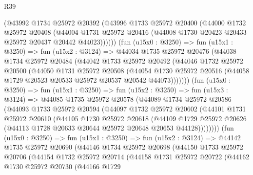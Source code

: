 \begin{lexlean}{R39}
\begin{coremodule}
          (@43992
            @1734
            @25972
            @20392
            (@43996
              @1733
              @25972
              @20400
              (@44000
                @1732
                @25972
                @20408
                (@44004
                  @1731
                  @25972
                  @20416
                  (@44008 @1730 @20423 @20433 @25972 @20437 @20442 @44023))))))
        (fun (u15x0 : @3250) =>
        fun (u15x1 : @3250) =>
        fun (u15x2 : @3124) =>
        @44034
          @1735
          @25972
          @20476
          (@44038
            @1734
            @25972
            @20484
            (@44042
              @1733
              @25972
              @20492
              (@44046
                @1732
                @25972
                @20500
                (@44050
                  @1731
                  @25972
                  @20508
                  (@44054
                    @1730
                    @25972
                    @20516
                    (@44058 @1729 @20523 @20533 @25972 @20537 @20542 @44073)))))))
        (fun (u15x0 : @3250) =>
        fun (u15x1 : @3250) =>
        fun (u15x2 : @3250) =>
        fun (u15x3 : @3124) =>
        @44085
          @1735
          @25972
          @20578
          (@44089
            @1734
            @25972
            @20586
            (@44093
              @1733
              @25972
              @20594
              (@44097
                @1732
                @25972
                @20602
                (@44101
                  @1731
                  @25972
                  @20610
                  (@44105
                    @1730
                    @25972
                    @20618
                    (@44109
                      @1729
                      @25972
                      @20626
                      (@44113 @1728 @20633 @20644 @25972 @20648 @20653 @44128))))))))
        (fun (u15x0 : @3250) =>
        fun (u15x1 : @3250) =>
        fun (u15x2 : @3124) =>
        @44142
          @1735
          @25972
          @20690
          (@44146
            @1734
            @25972
            @20698
            (@44150
              @1733
              @25972
              @20706
              (@44154
                @1732
                @25972
                @20714
                (@44158
                  @1731
                  @25972
                  @20722
                  (@44162
                    @1730
                    @25972
                    @20730
                    (@44166
                      @1729

\end{coremodule}
\end{lexlean}
